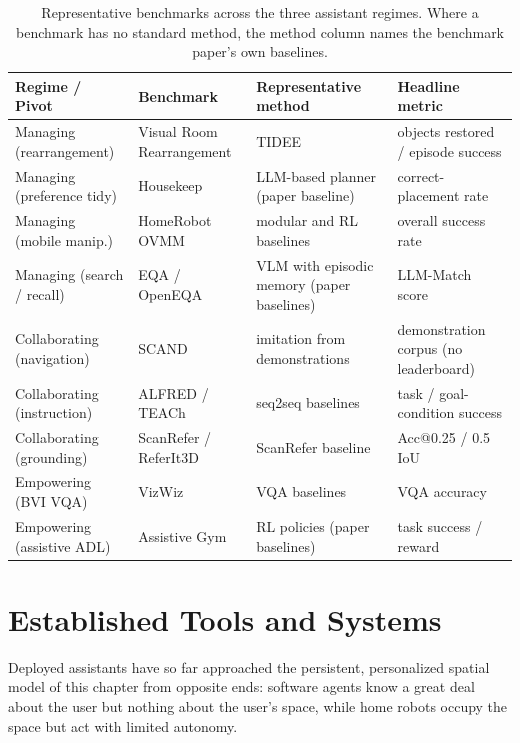\begin{table}[t]
\centering
\fontsize{8}{10}\selectfont
\setlength{\tabcolsep}{1.0mm}
\caption{Representative benchmarks across the three assistant regimes. Where a benchmark has no standard method, the method column names the benchmark paper's own baselines.}
\label{tab:p4_s13_1_benchmarks}
\begin{tabular}{L{0.20\textwidth} L{0.24\textwidth} L{0.26\textwidth} L{0.22\textwidth}}
\toprule
\textbf{Regime / Pivot} & \textbf{Benchmark} & \textbf{Representative method} & \textbf{Headline metric} \\
\midrule
Managing (rearrangement) & Visual Room Rearrangement \cite{weihs2021visual} & TIDEE \cite{sarch2022tidee} & objects restored / episode success \\
Managing (preference tidy) & Housekeep \cite{kant2022housekeep} & LLM-based planner (paper baseline) \cite{kant2022housekeep} & correct-placement rate \\
Managing (mobile manip.) & HomeRobot OVMM \cite{yenamandra2023homerobot} & modular and RL baselines \cite{yenamandra2023homerobot} & overall success rate \\
Managing (search / recall) & EQA \cite{das2018embodied} / OpenEQA \cite{majumdar2024openeqa} & VLM with episodic memory (paper baselines) \cite{majumdar2024openeqa} & LLM-Match score \\
Collaborating (navigation) & SCAND \cite{karnan2022socially} & imitation from demonstrations \cite{karnan2022socially} & demonstration corpus (no leaderboard) \\
Collaborating (instruction) & ALFRED \cite{shridhar2020alfred} / TEACh \cite{Padmakumar2022TEACh} & seq2seq baselines \cite{shridhar2020alfred,Padmakumar2022TEACh} & task / goal-condition success \\
Collaborating (grounding) & ScanRefer \cite{chen2020scanrefer} / ReferIt3D \cite{achlioptas2020referit3d} & ScanRefer baseline \cite{chen2020scanrefer} & Acc@0.25 / 0.5 IoU \\
Empowering (BVI VQA) & VizWiz \cite{gurari2018vizwiz} & VQA baselines \cite{gurari2018vizwiz} & VQA accuracy \\
Empowering (assistive ADL) & Assistive Gym \cite{erickson2020assistive} & RL policies (paper baselines) \cite{erickson2020assistive} & task success / reward \\
\bottomrule
\end{tabular}
\end{table}

\section{Established Tools and Systems}
\label{subsec:p4-sec13-1-established-tools-and-systems}
Deployed assistants have so far approached the persistent, personalized spatial model of this chapter from opposite ends: software agents know a great deal about the user but nothing about the user's space, while home robots occupy the space but act with limited autonomy.

